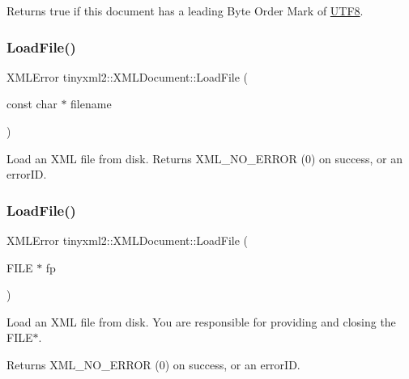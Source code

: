 Returns true if this document has a leading Byte Order Mark of \hyperlink{structUTF8}{U\+T\+F8}. \mbox{\label{classtinyxml2_1_1XMLDocument_a2ebd4647a8af5fc6831b294ac26a150a}} 
\subsubsection{\texorpdfstring{Load\+File()}{LoadFile()}\hspace{0.1cm}{\footnotesize\ttfamily [1/4]}}
{\footnotesize\ttfamily X\+M\+L\+Error tinyxml2\+::\+X\+M\+L\+Document\+::\+Load\+File (\begin{DoxyParamCaption}\item[{const char $\ast$}]{filename }\end{DoxyParamCaption})}

Load an X\+ML file from disk. Returns X\+M\+L\+\_\+\+N\+O\+\_\+\+E\+R\+R\+OR (0) on success, or an error\+ID. \mbox{\label{classtinyxml2_1_1XMLDocument_a5f1d330fad44c52f3d265338dd2a6dc2}} 
\subsubsection{\texorpdfstring{Load\+File()}{LoadFile()}\hspace{0.1cm}{\footnotesize\ttfamily [2/4]}}
{\footnotesize\ttfamily X\+M\+L\+Error tinyxml2\+::\+X\+M\+L\+Document\+::\+Load\+File (\begin{DoxyParamCaption}\item[{F\+I\+LE $\ast$}]{fp }\end{DoxyParamCaption})}

Load an X\+ML file from disk. You are responsible for providing and closing the F\+I\+L\+E$\ast$.

Returns X\+M\+L\+\_\+\+N\+O\+\_\+\+E\+R\+R\+OR (0) on success, or an error\+ID. \mbox{\label{classtinyxml2_1_1XMLDocument_a2ebd4647a8af5fc6831b294ac26a150a}} 
